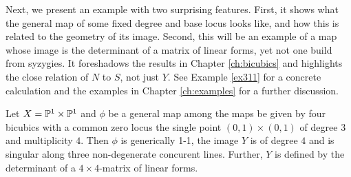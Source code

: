 \documentclass[fleqn,reqno]{amsart}
\numberwithin{first}{chapter}
\begin{document}
\begin{paragraf*}
Next, we present an example with two surprising features.
First, it shows what the general map of some fixed degree and base locus looks like,
and how this is related to the geometry of its image.
Second, this will be an example of a map whose image is the determinant of a matrix
of linear forms, yet not one build from syzygies.
It foreshadows the results in Chapter \ref{ch:bicubics} and highlights the close
relation of $N$ to $S$, not just $Y$.
See Example \ref{ex311} for a concrete calculation and the examples in Chapter \ref{ch:examples}
for a further discussion.
\end{paragraf*}

\begin{conjecture}
\label{conj:nice-example}
Let $X=\mathbb{P}^1\times\mathbb{P}^1$ and $\phi$ be a general map among the maps be given by four bicubics with
a common zero locus the single point $(0,1)\times(0,1)$ of degree $3$ and multiplicity $4$.
Then $\phi$ is generically 1-1, the image $Y$ is of degree $4$ and is singular along
three non-degenerate concurent lines.
Further, $Y$ is defined by the determinant of a $4\times4$-matrix of linear forms.
\end{conjecture}





\end{document}
